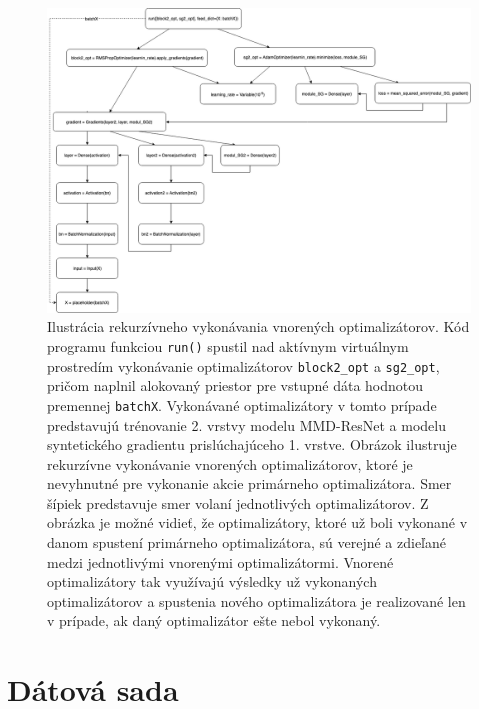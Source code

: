 \begin{figure}
\centerline{\includegraphics[width=1.0\textwidth]{images/rekurzivne.png}}
\caption[Ilustrácia rekurzívneho vykonávania vnorených optimalizátorov]{Ilustrácia rekurzívneho vykonávania vnorených optimalizátorov. Kód programu funkciou \texttt{run()} spustil nad aktívnym virtuálnym prostredím vykonávanie optimalizátorov \texttt{block2_opt} a \texttt{sg2_opt}, pričom naplnil alokovaný priestor pre vstupné dáta hodnotou premennej \texttt{batchX}. Vykonávané optimalizátory v tomto prípade predstavujú trénovanie 2. vrstvy modelu MMD-ResNet a modelu syntetického gradientu prislúchajúceho 1. vrstve. Obrázok ilustruje rekurzívne vykonávanie vnorených optimalizátorov, ktoré je nevyhnutné pre vykonanie akcie primárneho optimalizátora. Smer šípiek predstavuje smer volaní jednotlivých optimalizátorov. Z obrázka je možné vidieť, že optimalizátory, ktoré už boli vykonané v danom spustení primárneho optimalizátora, sú verejné a zdieľané medzi jednotlivými vnorenými optimalizátormi. Vnorené optimalizátory tak využívajú výsledky už vykonaných optimalizátorov a spustenia nového optimalizátora je realizované len v prípade, ak daný optimalizátor ešte nebol vykonaný.}
\label{rekurzivne}
\end{figure}

\section{Dátová sada}
\label{data_sets}

